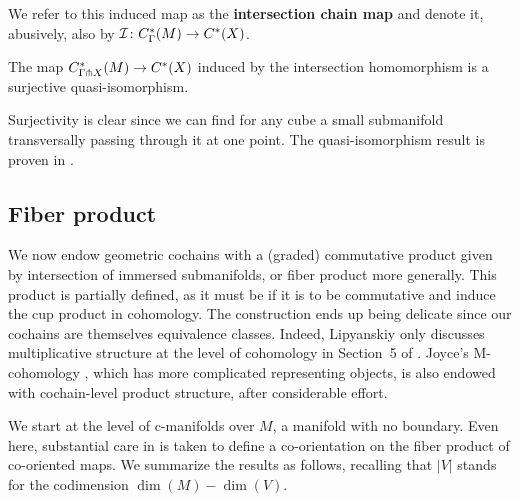 We refer to this induced map as the \textbf{intersection chain map} and denote it, abusively, also by $\mathcal{I} \colon C_\Gamma^*(M)\to C^*(X)$.

\begin{theorem}\label{T: stokes}
	The map $C^*_{\Gamma \pitchfork X}(M) \to C^{\ast}(X)$ induced by the intersection homomorphism is a surjective quasi-isomorphism.
\end{theorem}

Surjectivity is clear since we can find for any cube a small submanifold transversally passing through it at one point.
The quasi-isomorphism result is proven in \cite{medina2022foundations}.

\subsection{Fiber product}\label{S:fiber product section}

We now endow geometric cochains with a (graded) commutative product given by intersection of immersed submanifolds, or fiber product more generally.
This product is partially defined, as it must be if it is to be commutative and induce the cup product in cohomology.
The construction ends up being delicate since our cochains are themselves equivalence classes.
Indeed, Lipyanskiy only discusses multiplicative structure at the level of cohomology in Section~5 of \cite{Lipy14}.
Joyce's M-cohomology \cite{Joyc15}, which has more complicated representing objects, is also endowed with cochain-level product structure,
after considerable effort.

We start at the level of c-manifolds over $M$, a manifold with no boundary.
Even here, substantial care in \cite{medina2022foundations} is taken to define a co-orientation
on the fiber product of co-oriented maps. We summarize the results as follows, recalling that $|V|$ stands for the codimension $\dim(M)-\dim(V)$.

